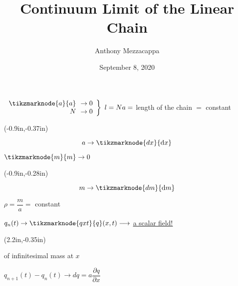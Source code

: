 \documentclass{article}
\title{Continuum Limit of the Linear Chain}
\author{Anthony Mezzacappa}
\date{September 8, 2020}
\begin{document}
\setlength{\parskip}{1em}
\maketitle

$\left.%
\begin{array}{rl}
    \tikzmarknode{a}{a} \!\!&\rightarrow 0 \\
    N \!\!&\rightarrow 0
\end{array}%
\right\rbrace ~ l = Na = $ length of the chain $=$ constant
{%
\begin{textblock*}{1in}(-0.9in,-0.37in)%
\begin{minipage}[h!]{1in}
    \begin{equation*}
        a \rightarrow \tikzmarknode{dx}{\mathrm{d} x}
    \end{equation*}
\end{minipage}%
\end{textblock*}%
}%

\vspace{-6pt}\quad%
$\tikzmarknode{m}{m} \rightarrow 0$
{%
\begin{textblock*}{1in}(-0.9in,-0.28in)%
\begin{minipage}[h!]{1in}
    \begin{equation*}
        m \rightarrow \tikzmarknode{dm}{\mathrm{d} m}
    \end{equation*}
\end{minipage}%
\end{textblock*}%
}

\quad $\rho = \dfrac{m}{a} = $ constant

\quad $q_n (t) \rightarrow \tikzmarknode{qxt}{q} ( x, t ) \longrightarrow $ \underline{\underline{ a scalar field! }}
{%
\begin{textblock*}{3in}(2.2in,-0.35in)%
\begin{minipage}[h!]{3in}
     of infinitesimal mass at $x$
\end{minipage}%
\end{textblock*}%
}

$q_{n+1} (t) - q_n (t) \rightarrow dq = a \dfrac{ \partial q }{ \partial x }$

\end{document}
